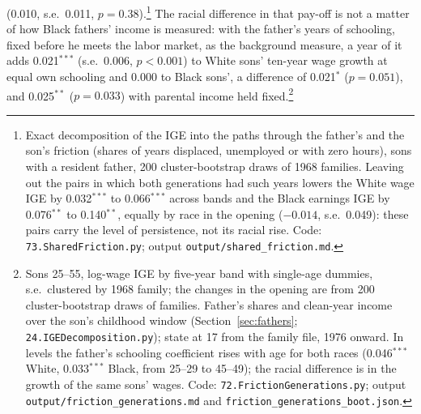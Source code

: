 (0.010, s.e.\ 0.011, $p = 0.38$).\footnote{Exact decomposition of the IGE into the paths through the father's and the
son's friction (shares of years displaced, unemployed or with zero hours), sons with a resident father, 200
cluster-bootstrap draws of 1968 families. Leaving out the pairs in which both generations had such years lowers the
White wage IGE by 0.032$^{***}$ to 0.066$^{***}$ across bands and the Black earnings IGE by 0.076$^{**}$ to
0.140$^{**}$, equally by race in the opening ($-0.014$, s.e.\ 0.049): these pairs carry the level of persistence, not
its racial rise. Code: \texttt{73.SharedFriction.py}; output \texttt{output/shared\_friction.md}.} The racial
difference in that pay-off is not a matter of how Black fathers' income is measured: with the father's years of
schooling, fixed before he meets the labor market, as the background measure, a year of it adds 0.021$^{***}$ (s.e.\
0.006, $p < 0.001$) to White sons' ten-year wage growth at equal own schooling and 0.000 to Black sons', a difference of
0.021$^{*}$ ($p = 0.051$), and 0.025$^{**}$ ($p = 0.033$) with parental income held fixed.\footnote{Sons 25--55,
log-wage IGE by five-year band with single-age dummies, s.e.\ clustered by 1968 family; the changes in the opening are
from 200 cluster-bootstrap draws of families. Father's shares and clean-year income over the son's childhood window
(Section~\ref{sec:fathers}; \texttt{24.IGEDecomposition.py}); state at 17 from the family file, 1976 onward. In levels the father's
schooling coefficient rises with age for both races (0.046$^{***}$ White, 0.033$^{***}$ Black, from 25--29 to 45--49);
the racial difference is in the growth of the same sons' wages. Code: \texttt{72.FrictionGenerations.py}; output
\texttt{output/friction\_generations.md} and \texttt{friction\_generations\_boot.json}.}


